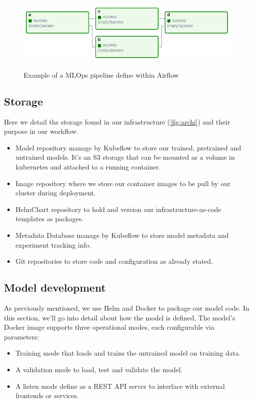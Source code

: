 \begin{figure}[!htbp]
    \centering
    \caption{Example of a MLOps pipeline define within Airflow}
    \includegraphics[scale=0.5]{images/project/data-ops-airflow-dag}
    \label{fig:project-ml-ops-airflow-dag}
\end{figure}

\subsection{Storage}\label{subsec:storage}
Here we detail the storage found in our infrastructure (\ref{fig:archi}) and their purpose in our workflow.

\begin{itemize}
    \item Model repository manage by Kubeflow to store our trained, pretrained and untrained models.
    It's an S3 storage that can be mounted as a volume in kubernetes and attached to a running container.
    \item Image repository where we store our container images to be pull by our cluster during deployment.
    \item HelmChart repository to hold and version our infrastructure-as-code templates as packages.
    \item Metadata Database manage by Kubeflow to store model metadata and experiment tracking info.
    \item Git repositories to store code and configuration as already stated.
\end{itemize}

\subsection{Model development}\label{subsec:model-development}
As previously mentioned, we use Helm and Docker to package our model code.
In this section, we'll go into detail about how the model is defined.
The model's Docker image supports three operational modes, each configurable via parameters:
\begin{itemize}
    \item Training mode that loads and trains the untrained model on training data.
    \item A validation mode to load, test and validate the model.
    \item A listen mode define as a REST API server to interface with external frontends or services.
\end{itemize}

